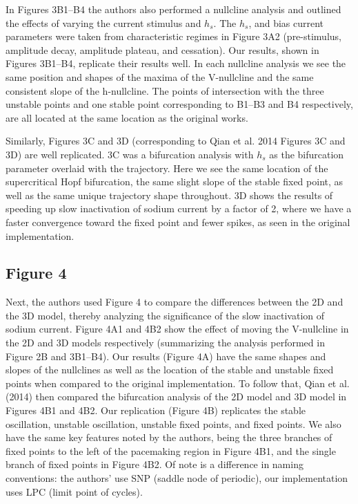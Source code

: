 In Figures 3B1--B4 the authors also performed a nullcline analysis and outlined the effects of varying the current stimulus and $h_s$. The $h_s$, and bias current parameters were taken from characteristic regimes in Figure 3A2 (pre-stimulus, amplitude decay, amplitude plateau, and cessation). Our results, shown in Figures 3B1--B4, replicate their results well. In each nullcline analysis we see the same position and shapes of the maxima of the V-nullcline and the same consistent slope of the h-nullcline. The points of intersection with the three unstable points and one stable point corresponding to B1--B3 and B4 respectively, are all located at the same location as the original works. 

Similarly, Figures 3C and 3D (corresponding to Qian et al. 2014 Figures 3C and 3D) are well replicated. 3C was a bifurcation analysis with $h_s$ as the bifurcation parameter overlaid with the trajectory. Here we see the same location of the supercritical Hopf bifurcation, the same slight slope of the stable fixed point, as well as the same unique trajectory shape throughout. 3D shows the results of speeding up slow inactivation of sodium current by a factor of 2, where we have a faster convergence toward the fixed point and fewer spikes, as seen in the original implementation.



\subsection{Figure 4}
Next, the authors used Figure 4 to compare the differences between the 2D and the 3D model, thereby analyzing the significance of the slow inactivation of sodium current. Figure 4A1 and 4B2 show the effect of moving the V-nullcline in the 2D and 3D models respectively (summarizing the analysis performed in Figure 2B and 3B1--B4). Our results (Figure 4A) have the same shapes and slopes of the nullclines as well as the location of the stable and unstable fixed points when compared to the original implementation. To follow that, Qian et al. (2014) then compared the bifurcation analysis of the 2D model and 3D model in Figures 4B1 and 4B2. Our replication (Figure 4B) replicates the stable oscillation, unstable oscillation, unstable fixed points, and fixed points. We also have the same key features noted by the authors, being the three branches of fixed points to the left of the pacemaking region in Figure 4B1, and the single branch of fixed points in Figure 4B2. Of note is a difference in naming conventions: the authors' use SNP (saddle node of periodic), our implementation uses LPC (limit point of cycles).

